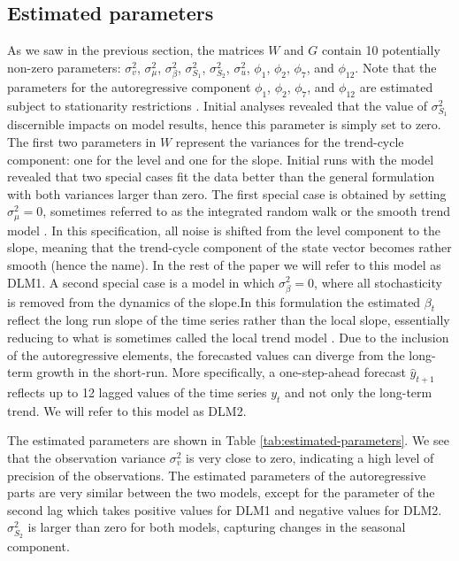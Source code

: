 \documentclass[12pt, a4paper]{article}
\begin{document}
\subsection{Estimated parameters}\label{estimated-parameters}

As we saw in the previous section, the matrices $W$ and $G$ contain 10 potentially non-zero parameters: $\sigma_{v}^{2}$, $\sigma_{\mu}^{2}$, $\sigma_{\beta}^{2}$, $\sigma_{S_{1}}^{2}$, $\sigma_{S_{2}}^{2}$, $\sigma^{2}_{u}$, $\phi_{1}$, $\phi_{2}$, $\phi_{7}$, and
$\phi_{12}$. Note that the parameters for the autoregressive
component $\phi_{1}$, $\phi_{2}$, $\phi_{7}$, and $\phi_{12}$ are estimated subject to stationarity restrictions \citep{monahan1984note}. Initial analyses revealed that the value of $\sigma_{S_{1}}^{2}$ discernible impacts on model results, hence this parameter is simply set to zero. The first two parameters in $W$ represent the variances for the trend-cycle component: one for the level and one for the
slope. Initial runs with the model revealed that two
special cases fit the data better than the general formulation with both variances larger than zero. The
first special case is obtained by setting $\sigma^{2}_{\mu} = 0$,
sometimes referred to as the integrated random walk or the smooth trend
model \citep{young1991recursive}. In this specification, all noise is shifted from the level component to the slope,
meaning that the trend-cycle component of the state vector becomes rather smooth (hence the
name). In the rest of the paper we will refer to this model as DLM1. A
second special case is a model in which $\sigma^{2}_{\beta} = 0$,
where all stochasticity is removed from the dynamics of the slope.In
this formulation the estimated $\beta_{t}$ reflect the long run slope
of the time series rather than the local slope, essentially reducing to what is sometimes called the local trend model \citep{durbin2012time}. Due to the inclusion of the autoregressive elements, the forecasted
values can diverge from the long-term growth in the short-run. More
specifically, a one-step-ahead forecast $\hat{y}_{t + 1}$ reflects up
to 12 lagged values of the time series $y_{t}$ and not only the long-term trend. We will refer to this model as DLM2. 

The estimated parameters are shown in Table
\ref{tab:estimated-parameters}.  We see that the observation variance
$\sigma_{v}^{2}$ is very close to zero, indicating a high level of
precision of the observations. The estimated parameters of the autoregressive parts are very similar between the two models, except for the parameter of the second lag which takes positive values for DLM1 and negative values for DLM2. $\sigma_{S_{2}}^{2}$ is larger than zero for both models, capturing changes in the seasonal component.
\end{document}
